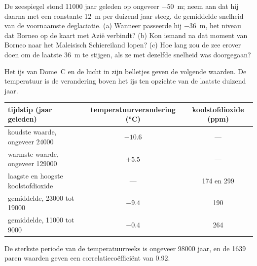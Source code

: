 \begin{exercise}[$\star\star\star$]\label{exo:g12:past-climates:15}
De zeespiegel stond \num{11000} jaar geleden op ongeveer \qty{-50}{m}; neem aan dat hij daarna
met een constante \qty{12}{m} per duizend jaar steeg, de gemiddelde snelheid van de voornaamste
deglaciatie. (a) Wanneer passeerde hij \qty{-36}{m}, het niveau dat Borneo
op de kaart met Azië verbindt? (b) Kon iemand na dat moment van Borneo naar
het Maleisisch Schiereiland lopen? (c) Hoe lang zou de zee erover doen om de laatste
\qty{36}{m} te stijgen, als ze met dezelfde snelheid was doorgegaan?
\end{exercise}

\begin{problem}
\label{pb:g12:past-climates:1}
Het ijs van Dome~C en de lucht in zijn belletjes geven de volgende waarden. De
temperatuur is de verandering boven het ijs ten opzichte van de laatste duizend jaar.

\begin{center}
\small
\begin{tabular}{|l|c|c|}
\hline
 \textbf{tijdstip (jaar geleden)} & \textbf{temperatuurverandering (\unit{\degreeCelsius})} & \textbf{koolstofdioxide (ppm)} \\
\hline
koudste waarde, ongeveer \num{24000} & $-10.6$ & --- \\
warmste waarde, ongeveer \num{129000} & $+5.5$ & --- \\
laagste en hoogste koolstofdioxide & --- & 174 en 299 \\
gemiddelde, \num{23000} tot \num{19000} & $-9.4$ & 190 \\
gemiddelde, \num{11000} tot \num{9000} & $-0.4$ & 264 \\
\hline
\end{tabular}
\end{center}

De sterkste periode van de temperatuurreeks is ongeveer \num{98000} jaar,
en de 1639 paren waarden geven een correlatiecoëfficiënt van 0.92.


\end{problem}
